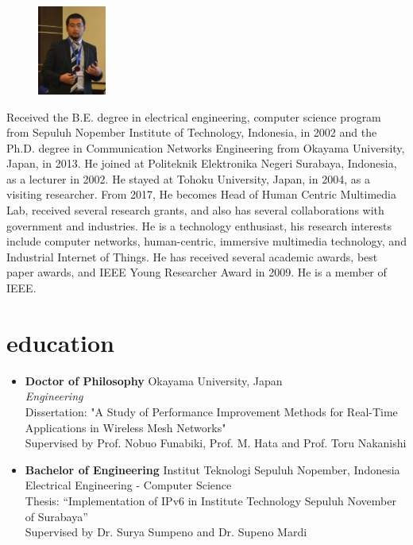\documentclass[style=verbose,maxnames=99,sorting=ydnt,style=verbose,maxnames=99,sorting=ydnt,backend=biber]{friggeri-cv} %
\renewenvironment{entrylist}{%
  \begin{itemize}[leftmargin=1in]%
}{%
  \end{itemize}
}
\renewcommand{\entry}[4]{%
  \item[#1]
    \textbf{#2}%
    \hfill%
    {\footnotesize\addfontfeature{Color=lightgray} #3}\\%
    #4\vspace{\parsep}%
  }
\begin{document}
\begin{figure}
	\vspace{-10pt}
	\begin{center}
    \includegraphics[width=0.2\textwidth]{dhoto-jas.jpg}
    \end{center}
    
\end{figure}
Received the B.E. degree in electrical engineering, computer science program from Sepuluh Nopember Institute of Technology, Indonesia, in 2002 and the Ph.D. degree in Communication Networks Engineering from Okayama University, Japan, in 2013. He joined at Politeknik Elektronika Negeri Surabaya, Indonesia, as a lecturer in 2002. He stayed at Tohoku University, Japan, in 2004, as a visiting researcher. From 2017, He becomes Head of Human Centric Multimedia Lab, received several research grants, and also has several collaborations with government and industries. He is a technology enthusiast, his research interests include computer networks, human-centric, immersive multimedia technology, and Industrial Internet of Things. He has received several academic awards, best paper awards, and IEEE Young Researcher Award in 2009. He is a member of IEEE.



\section{education}

\begin{entrylist}

\entry
{2009--2013}
{Doctor {\normalfont of Philosophy}}
{Okayama University, Japan}
{\emph{Engineering} \\ 
Dissertation: "A Study of Performance Improvement Methods for Real-Time Applications in Wireless Mesh Networks" \\
Supervised by Prof. Nobuo Funabiki, Prof. M. Hata and Prof. Toru Nakanishi}

\entry
{1997--2002}
{Bachelor {\normalfont of Engineering}}
{Institut Teknologi Sepuluh Nopember, Indonesia}
{Electrical Engineering - Computer Science\\
Thesis: “Implementation of IPv6 in Institute Technology Sepuluh November of Surabaya” 
\\Supervised by Dr. Surya Sumpeno and Dr. Supeno Mardi
}

\end{entrylist}
\end{document}
